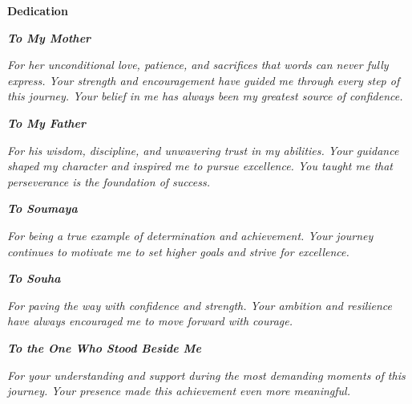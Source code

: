 \thispagestyle{empty}

\begin{center}
{\LARGE \textbf{Dedication}}
\end{center}

\vspace{1.5cm}

\begin{center}
\begin{minipage}{0.82\textwidth}
\centering
\normalsize

\textbf{\textit{To My Mother}}

\vspace{0.3cm}
\itshape
For her unconditional love, patience, and sacrifices that words can never fully express. 
Your strength and encouragement have guided me through every step of this journey. 
Your belief in me has always been my greatest source of confidence.

\vspace{0.9cm}

\textbf{\textit{To My Father}}

\vspace{0.3cm}
\itshape
For his wisdom, discipline, and unwavering trust in my abilities. 
Your guidance shaped my character and inspired me to pursue excellence. 
You taught me that perseverance is the foundation of success.

\vspace{0.9cm}

\textbf{\textit{To Soumaya}}

\vspace{0.3cm}
\itshape
For being a true example of determination and achievement. 
Your journey continues to motivate me to set higher goals and strive for excellence.

\vspace{0.9cm}

\textbf{\textit{To Souha}}

\vspace{0.3cm}
\itshape
For paving the way with confidence and strength. 
Your ambition and resilience have always encouraged me to move forward with courage.

\vspace{0.9cm}

\textbf{\textit{To the One Who Stood Beside Me}}

\vspace{0.3cm}
\itshape
For your understanding and support during the most demanding moments of this journey. 
Your presence made this achievement even more meaningful.

\end{minipage}
\end{center}